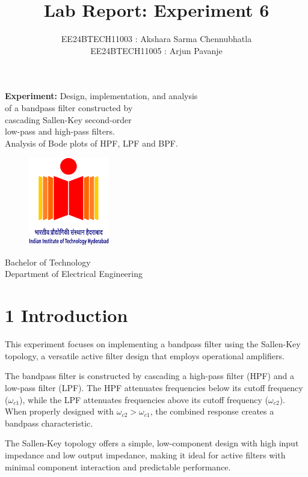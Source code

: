 \documentclass{article}
\title{\textbf{Lab Report: Experiment 6}}
\author{EE24BTECH11003 : Akshara Sarma Chennubhatla\\EE24BTECH11005 : Arjun Pavanje}
\begin{document}
\maketitle
\begin{center}
	\textbf{Experiment:} Design, implementation, and analysis\\of a bandpass filter constructed by\\cascading Sallen-Key second-order\\low-pass and high-pass filters.\\Analysis of Bode plots of HPF, LPF and BPF.
\end{center}
\vspace{30pt}
\begin{figure}[h!]
	\centering
	\includegraphics[width = 100pt]{.logo/logo.png}\\
\end{figure}
\begin{center}
	Bachelor of Technology\\
	\vspace{10pt}
	Department of Electrical Engineering\\
\end{center}
\newpage

\section*{1 Introduction}

This experiment focuses on implementing a bandpass filter using the Sallen-Key topology, a versatile active filter design that employs operational amplifiers.

The bandpass filter is constructed by cascading a high-pass filter (HPF) and a low-pass filter (LPF). The HPF attenuates frequencies below its cutoff frequency ($\omega_{c1}$), while the LPF attenuates frequencies above its cutoff frequency ($\omega_{c2}$). When properly designed with $\omega_{c2} > \omega_{c1}$, the combined response creates a bandpass characteristic.

The Sallen-Key topology offers a simple, low-component design with high input impedance and low output impedance, making it ideal for active filters with minimal component interaction and predictable performance.
\end{document}
